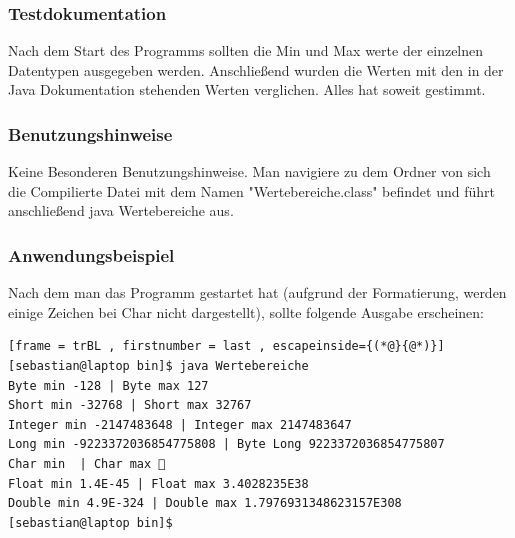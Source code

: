 \subsubsection{Testdokumentation}
Nach dem Start des Programms sollten die Min und Max werte der einzelnen Datentypen ausgegeben
werden. Anschlie\ss end wurden die Werten mit den in der Java Dokumentation stehenden Werten
verglichen. Alles hat soweit gestimmt.

\subsubsection{Benutzungshinweise}
Keine Besonderen Benutzungshinweise.
Man navigiere zu dem Ordner von sich die Compilierte Datei mit dem Namen "Wertebereiche.class"
\space befindet und führt anschlie\ss end java Wertebereiche aus.

\subsubsection{Anwendungsbeispiel}
Nach dem man das Programm gestartet hat (aufgrund der Formatierung, werden einige Zeichen bei Char nicht dargestellt), sollte folgende Ausgabe erscheinen:

\begin{lstlisting}[frame = trBL , firstnumber = last , escapeinside={(*@}{@*)}]
[sebastian@laptop bin]$ java Wertebereiche
Byte min -128 | Byte max 127
Short min -32768 | Short max 32767
Integer min -2147483648 | Integer max 2147483647
Long min -9223372036854775808 | Byte Long 9223372036854775807
Char min  | Char max ￿
Float min 1.4E-45 | Float max 3.4028235E38
Double min 4.9E-324 | Double max 1.7976931348623157E308
[sebastian@laptop bin]$ 
\end{lstlisting}